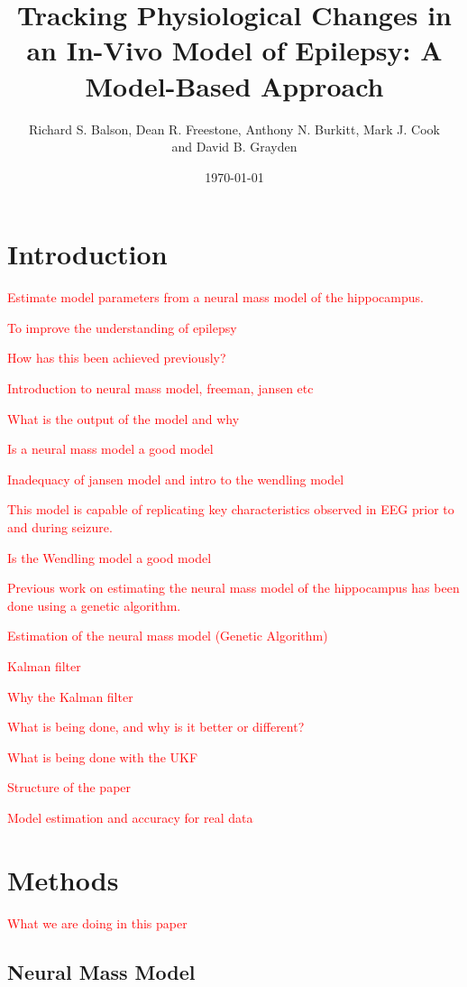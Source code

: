 \documentclass{article}%
\title{Tracking Physiological Changes in an In-Vivo Model of Epilepsy: A Model-Based Approach}
\date{\today}
\author{Richard S. Balson, Dean R. Freestone, Anthony N. Burkitt, Mark J. Cook \\ and David B. Grayden}
\newcommand\red{\textcolor{red}}
\begin{document}
\maketitle

\section{Introduction}

\red{Estimate model parameters from a neural mass model of the hippocampus.}

\red{To improve the understanding of epilepsy} 

\red{How has this been achieved previously?}

\red{Introduction to neural mass model, freeman, jansen etc}

\red{What is the output of the model and why}

\red{Is a neural mass model a good model}

\red{Inadequacy of jansen model and intro to the wendling model}

\red{This model is capable of replicating key characteristics observed in EEG prior to and during seizure.}

\red{Is the Wendling model a good model}

\red{Previous work on estimating the neural mass model of the hippocampus has been done using a genetic algorithm.}

\red{Estimation of the neural mass model (Genetic Algorithm)}

\red{Kalman filter}

\red{Why the Kalman filter}

\red{What is being done, and why is it better or different?}

\red{What is being done with the UKF}

\red{Structure of the paper}

\red{Model estimation and accuracy for real data}

\section{Methods}

\red{ What we are doing in this paper}


\subsection{Neural Mass Model} 
\end{document}
